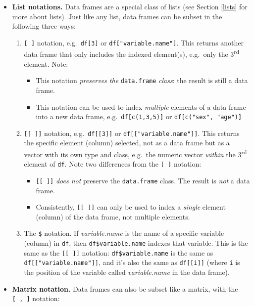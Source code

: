 \documentclass[
]{book}
\providecommand{\tightlist}{%
  \setlength{\itemsep}{0pt}\setlength{\parskip}{0pt}}
\begin{document}
\begin{itemize}
\tightlist
\item
  \textbf{List notations.} Data frames are a special class of lists (see Section \ref{lists} for more about lists). Just like any list, data frames can be subset in the following three ways:

  \begin{enumerate}
  \def\labelenumi{\arabic{enumi}.}
  \tightlist
  \item
    \texttt{{[}\ {]}} notation, e.g.~\texttt{df{[}3{]}} or \texttt{df{[}"variable.name"{]}}. This returns another data frame that only includes the indexed element(s), e.g.~only the 3\textsuperscript{rd} element. Note:

    \begin{itemize}
    \tightlist
    \item
      This notation \emph{preserves the} \texttt{data.frame} \emph{class}: the result is still a data frame.
    \item
      This notation can be used to index \emph{multiple} elements of a data frame into a new data frame, e.g.~\texttt{df{[}c(1,3,5){]}} or \texttt{df{[}c("sex",\ "age"){]}}
    \end{itemize}
  \item
    \texttt{{[}{[}\ {]}{]}} notation, e.g.~\texttt{df{[}{[}3{]}{]}} or \texttt{df{[}{[}"variable.name"{]}{]}}. This returns the specific element (column) selected, not as a data frame but as a vector with its own type and class, e.g.~the numeric vector \emph{within} the 3\textsuperscript{rd} element of \texttt{df}. Note two differences from the \texttt{{[}\ {]}} notation:

    \begin{itemize}
    \tightlist
    \item
      \texttt{{[}{[}\ {]}{]}} \emph{does not} preserve the \texttt{data.frame} class. The result is \emph{not} a data frame.
    \item
      Consistently, \texttt{{[}{[}\ {]}{]}} can only be used to index a \emph{single} element (column) of the data frame, not multiple elements.
    \end{itemize}
  \item
    The \texttt{\$} notation. If \emph{variable.name} is the name of a specific variable (column) in \texttt{df}, then \texttt{df\$variable.name} indexes that variable. This is the same as the \texttt{{[}{[}\ {]}{]}} notation: \texttt{df\$variable.name} is the same as \texttt{df{[}{[}"variable.name"{]}{]}}, and it's also the same as \texttt{df{[}{[}i{]}{]}} (where \texttt{i} is the position of the variable called \emph{variable.name} in the data frame).
  \end{enumerate}
\item
  \textbf{Matrix notation.} Data frames can also be subset like a matrix, with the \texttt{{[}\ ,\ {]}} notation:


\end{itemize}
\end{document}
